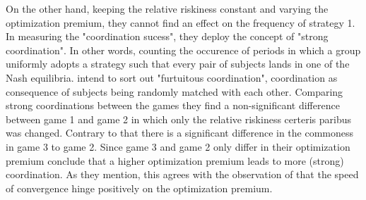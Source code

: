 \documentclass[11pt]{article}
\begin{document}
On the other hand, keeping the relative riskiness constant and varying the
optimization premium, they cannot find an effect on the frequency of 
strategy 1. 
In measuring the "coordination sucess", they deploy the concept of "strong
coordination". 
In other words, counting the occurence of periods in which a group
uniformly adopts a strategy such that every pair of subjects lands in one
of the Nash equilibria. \textcite{dubois_optimization_2012} intend to sort 
out "furtuitous coordination", coordination as consequence of subjects being
randomly matched with each other. Comparing strong coordinations between the
games they find a non-significant difference between game 1 and game 2 in 
which only the relative riskiness certeris paribus was changed. Contrary to 
that there is a significant difference in the commoness in game 3 to game 2.
Since game 3 and game 2 only differ in their optimization premium 
\textcite{dubois_optimization_2012} conclude that a higher optimization
premium leads to more (strong) coordination. As they mention, this agrees
with the observation of \textcite{battalio_optimization_2001} that the 
speed of convergence hinge positively on the optimization premium. 
\end{document}
